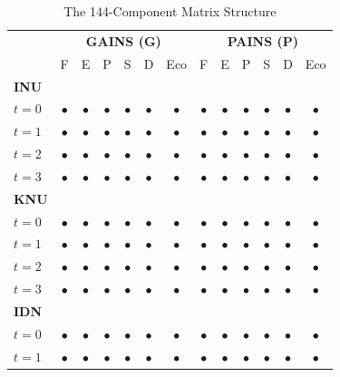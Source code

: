\begin{table}[htbp]
\centering
\caption{The 144-Component Matrix Structure}
\label{tab:144-matrix}
\small
\begin{tabular}{@{}l|cccccc|cccccc@{}}
\toprule
& \multicolumn{6}{c|}{\textbf{GAINS (G)}} & \multicolumn{6}{c}{\textbf{PAINS (P)}} \\
& F & E & P & S & D & Eco & F & E & P & S & D & Eco \\
\midrule
\textbf{INU} & & & & & & & & & & & & \\
\quad $t=0$ & $\bullet$ & $\bullet$ & $\bullet$ & $\bullet$ & $\bullet$ & $\bullet$ & $\bullet$ & $\bullet$ & $\bullet$ & $\bullet$ & $\bullet$ & $\bullet$ \\
\quad $t=1$ & $\bullet$ & $\bullet$ & $\bullet$ & $\bullet$ & $\bullet$ & $\bullet$ & $\bullet$ & $\bullet$ & $\bullet$ & $\bullet$ & $\bullet$ & $\bullet$ \\
\quad $t=2$ & $\bullet$ & $\bullet$ & $\bullet$ & $\bullet$ & $\bullet$ & $\bullet$ & $\bullet$ & $\bullet$ & $\bullet$ & $\bullet$ & $\bullet$ & $\bullet$ \\
\quad $t=3$ & $\bullet$ & $\bullet$ & $\bullet$ & $\bullet$ & $\bullet$ & $\bullet$ & $\bullet$ & $\bullet$ & $\bullet$ & $\bullet$ & $\bullet$ & $\bullet$ \\
\midrule
\textbf{KNU} & & & & & & & & & & & & \\
\quad $t=0$ & $\bullet$ & $\bullet$ & $\bullet$ & $\bullet$ & $\bullet$ & $\bullet$ & $\bullet$ & $\bullet$ & $\bullet$ & $\bullet$ & $\bullet$ & $\bullet$ \\
\quad $t=1$ & $\bullet$ & $\bullet$ & $\bullet$ & $\bullet$ & $\bullet$ & $\bullet$ & $\bullet$ & $\bullet$ & $\bullet$ & $\bullet$ & $\bullet$ & $\bullet$ \\
\quad $t=2$ & $\bullet$ & $\bullet$ & $\bullet$ & $\bullet$ & $\bullet$ & $\bullet$ & $\bullet$ & $\bullet$ & $\bullet$ & $\bullet$ & $\bullet$ & $\bullet$ \\
\quad $t=3$ & $\bullet$ & $\bullet$ & $\bullet$ & $\bullet$ & $\bullet$ & $\bullet$ & $\bullet$ & $\bullet$ & $\bullet$ & $\bullet$ & $\bullet$ & $\bullet$ \\
\midrule
\textbf{IDN} & & & & & & & & & & & & \\
\quad $t=0$ & $\bullet$ & $\bullet$ & $\bullet$ & $\bullet$ & $\bullet$ & $\bullet$ & $\bullet$ & $\bullet$ & $\bullet$ & $\bullet$ & $\bullet$ & $\bullet$ \\
\quad $t=1$ & $\bullet$ & $\bullet$ & $\bullet$ & $\bullet$ & $\bullet$ & $\bullet$ & $\bullet$ & $\bullet$ & $\bullet$ & $\bullet$ & $\bullet$ & $\bullet$ \\

\end{tabular}
\end{table}
